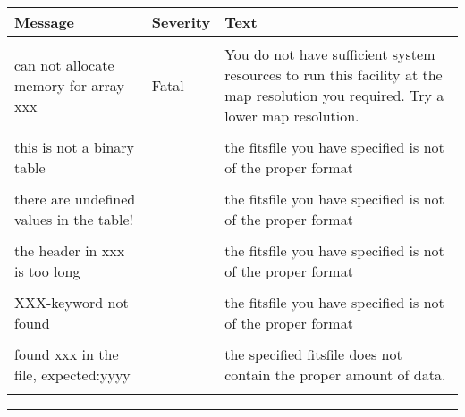 \begin{messages}
{
\begin{tabular}{p{0.25\hsize} p{0.1\hsize} p{0.35\hsize}} \hline  
  \textbf{Message} & \textbf{Severity} & \textbf{Text} \\ \hline
                   &                   &   \\ %
can not allocate memory for array xxx &  Fatal & You do not have
                   sufficient system resources to run this
                   facility at the map resolution you required. 
  Try a lower map resolution.  \\ 
                   &                   &   \\ \hline %

this is not a binary table & & the fitsfile you have specified is not 
of the proper format \\
                   &                   &   \\ \hline %
there are undefined values in the table! & & the fitsfile you have specified is not 
of the proper format \\
                  &                   &   \\ \hline %
the header in xxx is too long & & the fitsfile you have specified is not 
of the proper format \\
                  &                   &   \\ \hline %
XXX-keyword not found & & the fitsfile you have specified is not 
of the proper format \\
                  &                   &   \\ \hline %
found xxx in the file, expected:yyyy & & the specified fitsfile does not
contain the proper amount of data. \\
                   &                   &   \\ \hline %

\end{tabular}
} 
\end{messages}

\rule{\hsize}{2mm}

\newpage

